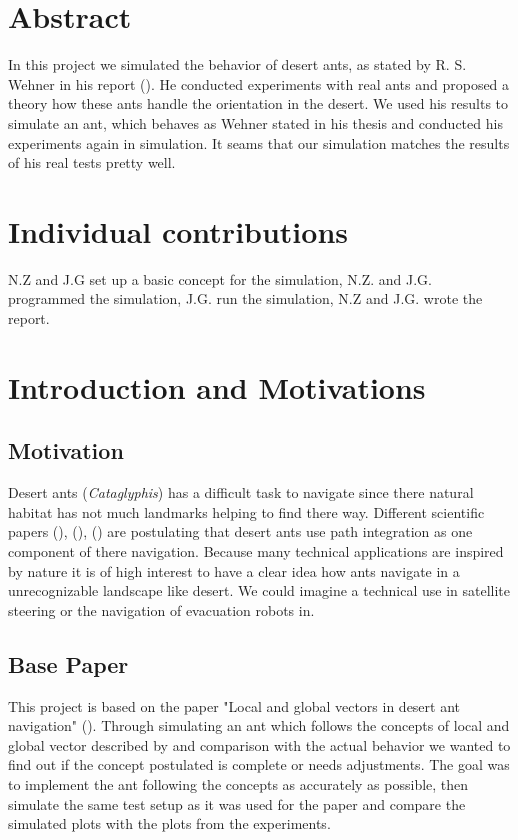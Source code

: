 \documentclass[11pt]{article}
\begin{document}
\newpage




\section{Abstract} %
	In this project we simulated the behavior of desert ants, as stated by R. S. Wehner in his report (\cite{wehner}). He conducted experiments with real ants and proposed a theory how these ants handle the orientation in the desert. We used his results to simulate an ant, which behaves as Wehner stated in his thesis and conducted his experiments again in simulation. It seams that our simulation matches the results of his real tests pretty well.
\newpage

\section{Individual contributions} %
	N.Z and J.G set up a basic concept for the simulation, N.Z. and J.G. programmed the simulation, J.G. run the simulation, N.Z and J.G. wrote the report.
\section{Introduction and Motivations} %
	\subsection{Motivation}
		Desert ants (\textit{Cataglyphis}) has a difficult task to navigate since there natural habitat has not much landmarks helping to find there way. Different scientific papers (\cite{mueller}), (\cite{wehner}), (\cite{knaden}) are postulating that desert ants use path integration as one component of there navigation. Because many technical applications are inspired by nature it is of high interest to have a clear idea how ants navigate in a unrecognizable landscape like desert. We could imagine a technical use in satellite steering or the navigation of evacuation robots in. 
	\subsection{Base Paper}
		This project is based on the paper "Local and global vectors in desert ant navigation" (\cite{wehner}). Through simulating an ant which follows the concepts of local and global vector described by \cite{wehner} and comparison with the actual behavior we wanted to find out if the concept postulated is complete or needs  adjustments. The goal was to implement the ant following the concepts as accurately as possible, then simulate the same test setup as it was used for the paper and compare the simulated plots with the plots from the experiments. 
\end{document}
